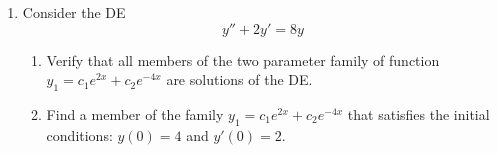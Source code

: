 \documentclass[exam=1]{math252exam}
\begin{document}
\maketitle

\begin{enumerate}[label=\arabic*.]
     Consider the autonomous differential equation below.
	\begin{enumerate}[label=(\alph*)]
	    \subproblem Determine the equilibrium solutions of the differential equation.
		\subproblem Draw a phase portrait diagram for the differential equation.
		\subproblem For each equilibrium solutions, state whether it is stable, unstable, or semistable.
	\end{enumerate}
	\[ \frac{dy}{dx} = (3-y)(y+2)^{2}(y-5) \]
	\item Consider the DE \[ y'' + 2y' = 8y \]
	\begin{enumerate}[label=(\roman*)]
	    \item Verify that all members of the two parameter family of function $y_{1}=c_{1}e^{2x} + c_{2}e^{-4x}$ are solutions of the DE.
		\item Find a member of the family $y_{1}=c_{1}e^{2x} + c_{2}e^{-4x}$ that satisfies the initial conditions: $y(0)=4$ and $y'(0) = 2$.
\end{enumerate}
\end{enumerate}
\end{document}
